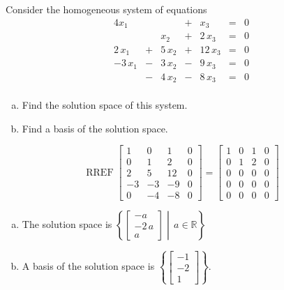 
\begin{exerciseStatement}


Consider the homogeneous system of equations 
\begin{alignat*}{4} x_{1} & &  &+& x_{3} &=& 0 \\ & & x_{2} &+& 2 \, x_{3} &=& 0 \\2 \, x_{1} &+& 5 \, x_{2} &+& 12 \, x_{3} &=& 0 \\-3 \, x_{1} &-& 3 \, x_{2} &-& 9 \, x_{3} &=& 0 \\ &-& 4 \, x_{2} &-& 8 \, x_{3} &=& 0 \\ \end{alignat*}
            


\begin{enumerate}[(a)]
\item  Find the solution space of this system.
\item  Find a basis of the solution space.
\end{enumerate}
    
\end{exerciseStatement}
    
\begin{exerciseAnswer} 


\[\operatorname{RREF} \left[\begin{array}{ccc|c}
1 & 0 & 1 & 0 \\
0 & 1 & 2 & 0 \\
2 & 5 & 12 & 0 \\
-3 & -3 & -9 & 0 \\
0 & -4 & -8 & 0
\end{array}\right] = \left[\begin{array}{ccc|c}
1 & 0 & 1 & 0 \\
0 & 1 & 2 & 0 \\
0 & 0 & 0 & 0 \\
0 & 0 & 0 & 0 \\
0 & 0 & 0 & 0
\end{array}\right] \]


\begin{enumerate}[(a)]
\item The solution space is \( \left\{ \left[\begin{array}{c}
-a \\
-2 \, a \\
a
\end{array}\right] \middle|\,a\in\mathbb{R}\right\} \)
\item A basis of the solution space is \( \left\{ \left[\begin{array}{c}
-1 \\
-2 \\
1
\end{array}\right] \right\} \).
\end{enumerate}
    
\end{exerciseAnswer}
    
